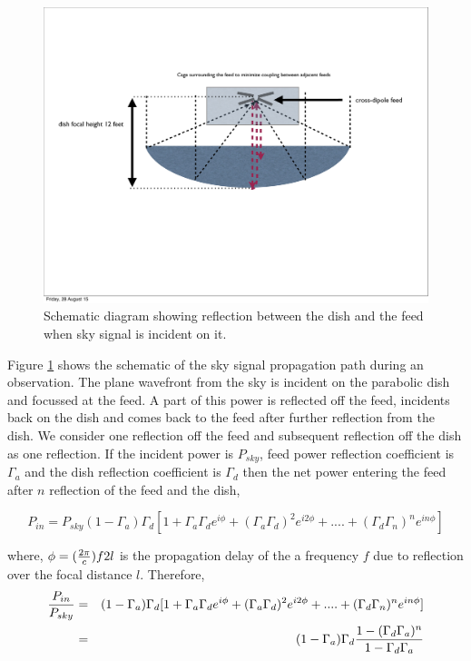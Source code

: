 \documentclass[12pt,preprint]{aastex}
\begin{document}
\begin{figure}
\centering
\includegraphics[totalheight=0.5\textheight]{schematic.pdf}
\caption{Schematic diagram showing reflection between the dish and the feed when sky signal is incident on it. }
\label{reflection_schematic}
\end{figure}
Figure \ref{reflection_schematic} shows the schematic of the sky signal propagation path during an observation. The plane wavefront from the sky is incident on the parabolic dish and focussed at the feed. A part of this power is reflected off the feed, incidents back on the dish and comes back to the feed after further reflection from the dish. We consider one reflection off the feed and subsequent reflection off the dish as one reflection. If the incident power is $P_{sky}$, feed power reflection coefficient is $\Gamma_{a}$ and the dish reflection coefficient is $\Gamma_{d}$ then the net power entering the feed after $n$ reflection of the feed and the dish,  

\begin{equation}
P_{in} =  P_{sky}(1-\Gamma_{a})\Gamma_{d} [1+ \Gamma_{a}\Gamma_{d} e^{i\phi}+ (\Gamma_{a}\Gamma_{d})^2e^{i2\phi}+ ....+ (\Gamma_{d}\Gamma_{n})^{n}e^{in\phi}]
\end{equation}

where, $\phi = ({2\pi \over c})f 2l$ is the propagation delay of the a frequency $f$ due to reflection over the focal distance $l$. 
Therefore, 
\begin{eqnarray}
{P_{in} \over P_{sky} } & = & (1-\Gamma_{a})\Gamma_{d} [1+ \Gamma_{a}\Gamma_{d} e^{i\phi}+ (\Gamma_{a}\Gamma_{d})^2e^{i2\phi}+ ....+ (\Gamma_{d}\Gamma_{n})^{n}e^{in\phi}] \nonumber\\
      & = & (1-\Gamma_{a})\Gamma_{d} {1-(\Gamma_{d}\Gamma_{a})^{n} \over 1-\Gamma_{d} \Gamma_{a} } 
\end{eqnarray}
\end{document}
